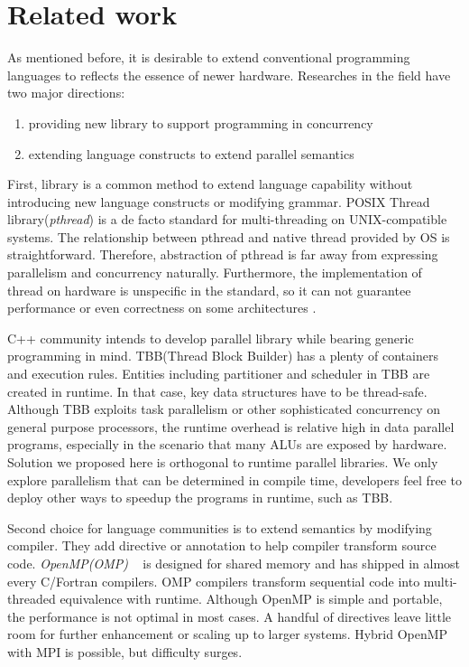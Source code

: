 \documentclass[10pt, conference, compsocconf]{IEEEtran}
\begin{document}
\section{Related work}
As mentioned before, it is desirable to extend conventional programming languages to reflects the essence of newer hardware. Researches in the field have two major directions:
\begin{enumerate}
\item providing new library to support programming in concurrency
\item extending language constructs to extend parallel semantics
\end{enumerate}

First, library is a common method to extend language capability
without introducing new language constructs or modifying
grammar. POSIX Thread library(\emph{pthread}) is a de facto standard for
multi-threading on UNIX-compatible systems. The relationship between pthread and native thread provided by OS is straightforward. Therefore, abstraction of pthread is far away from expressing parallelism and concurrency naturally. Furthermore, the implementation of thread on hardware is unspecific in the standard, so it can not guarantee performance or even correctness on some architectures \cite{b4, b5}.

C++ community intends to develop parallel library while bearing generic programming in mind. TBB(Thread Block Builder) has a plenty of containers and execution rules. Entities including partitioner and scheduler in TBB are created in runtime. In that case, key data structures have to be thread-safe. Although TBB exploits task parallelism or other sophisticated concurrency on general purpose processors, the runtime overhead is relative high in data parallel programs, especially in the scenario that many ALUs are exposed by hardware. Solution we proposed here is orthogonal to runtime parallel libraries. We only explore parallelism that can be determined in compile time, developers feel free to deploy other ways to speedup the programs in runtime, such as TBB.
 

Second choice for language communities is to extend semantics by
modifying compiler. They add directive or annotation to help compiler
transform source code. \emph{OpenMP(OMP)} ~\cite{b20} is designed for shared memory and has shipped in almost every C/Fortran compilers. OMP compilers transform sequential code into multi-threaded equivalence with runtime. Although OpenMP is simple and portable, the performance is not optimal in most cases. A handful of directives leave little room for further enhancement or scaling up to larger systems. Hybrid OpenMP with MPI is possible, but difficulty surges.
\end{document}
